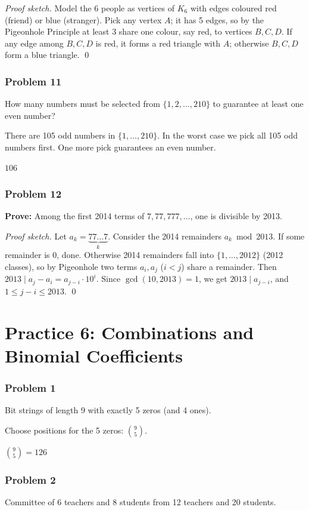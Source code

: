 \textit{Proof sketch.}
Model the 6 people as vertices of $K_6$ with edges coloured red (friend) or blue (stranger). Pick any vertex $A$; it has 5 edges, so by the Pigeonhole Principle at least 3 share one colour, say red, to vertices $B,C,D$. If any edge among $B,C,D$ is red, it forms a red triangle with $A$; otherwise $B,C,D$ form a blue triangle. \qed

\subsubsection*{Problem 11}
How many numbers must be selected from $\{1,2,\dots,210\}$ to guarantee at least one even number?

There are 105 odd numbers in $\{1,\dots,210\}$. In the worst case we pick all 105 odd numbers first. One more pick guarantees an even number.

$\boxed{106}$

\subsubsection*{Problem 12}
\textbf{Prove:} Among the first 2014 terms of $7, 77, 777, \ldots$, one is divisible by 2013.

\textit{Proof sketch.}
Let $a_k = \underbrace{77\ldots7}_{k}$. Consider the 2014 remainders $a_k \bmod 2013$. If some remainder is 0, done. Otherwise 2014 remainders fall into $\{1,\dots,2012\}$ (2012 classes), so by Pigeonhole two terms $a_i, a_j$ ($i<j$) share a remainder. Then $2013 \mid a_j - a_i = a_{j-i}\cdot 10^i$. Since $\gcd(10,2013)=1$, we get $2013\mid a_{j-i}$, and $1\le j-i\le 2013$. \qed

\section*{Practice 6: Combinations and Binomial Coefficients}

\subsubsection*{Problem 1}
Bit strings of length 9 with exactly 5 zeros (and 4 ones).

Choose positions for the 5 zeros: $\binom{9}{5}$.

$\boxed{\binom{9}{5} = 126}$

\subsubsection*{Problem 2}
Committee of 6 teachers and 8 students from 12 teachers and 20 students.

